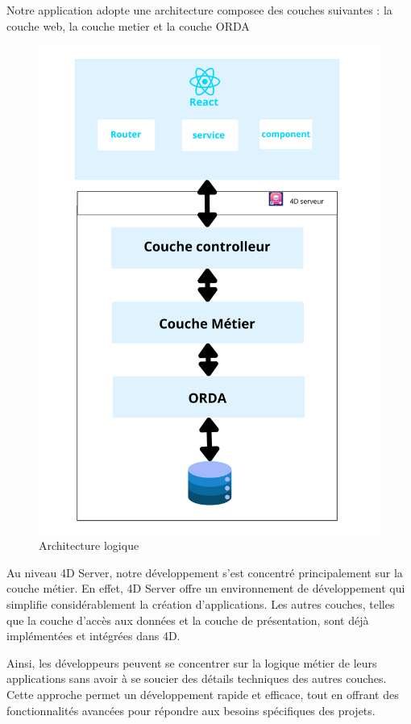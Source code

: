 Notre application adopte une architecture composee des couches suivantes : la couche web, la couche metier et la couche ORDA

\begin{figure}[htbp]
   \centering
   \includegraphics[scale=0.1]{Images/archiLogic.png} 
   \caption{Architecture logique}
   \label{fig:logiqueArch}
\end{figure}

Au niveau 4D Server, notre développement s’est concentré principalement sur la couche métier. En effet, 4D Server offre un environnement de développement qui simplifie considérablement la création d’applications. Les autres couches, telles que la couche d’accès aux données et la couche de présentation, sont déjà implémentées et intégrées dans 4D.
\newline

Ainsi, les développeurs peuvent se concentrer sur la logique métier de leurs applications sans avoir à se soucier des détails techniques des autres couches. Cette approche permet un développement rapide et eﬀicace, tout en offrant des fonctionnalités avancées pour répondre aux besoins spécifiques des projets.
\newline

